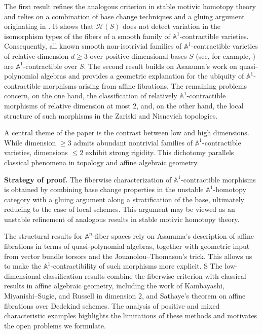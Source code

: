 \documentclass[10pt]{amsart}
\renewcommand{\AA}{\mathbb{A}}
\numberwithin{equation}{section} %
\theoremstyle{plain}
\theoremstyle{definition}
\theoremstyle{remark}
\begin{document}
The first result refines the analogous criterion in stable motivic homotopy theory and relies on a combination of base change techniques and a gluing argument originating in \cite{MV99}. It shows that $\mathcal{H}(S)$ does not detect variation in the isomorphism types of the fibers of a smooth family of $\AA^1$-contractible varieties. Consequently, all known smooth non-isotrivial families of $\AA^1$-contractible varieties of relative dimension $d \geq 3$ over positive-dimensional bases $S$ (see, for example, \cite{DF14,dubouloz2025,Krishna25}) are $\AA^1$-contractible over $S$. 
The second result builds on Asanuma’s work on quasi-polynomial algebras \cite{asanuma82,asanuma1987polynomial} and provides a geometric explanation for the ubiquity of $\AA^1$-contractible morphisms arising from affine fibrations. 
The remaining problems concern, on the one hand, the classification of relatively $\AA^1$-contractible morphisms of relative dimension at most $2$, and, on the other hand, the local structure of such morphisms in the Zariski and Nisnevich topologies.
\medskip

A central theme of the paper is the contrast between low and high dimensions. While dimension $\geq 3$ admits abundant nontrivial families of $\AA^1$-contractible varieties, dimensions $\leq 2$ exhibit strong rigidity. This dichotomy parallels classical phenomena in topology and affine algebraic geometry.
\medskip
\noindent

\textbf{Strategy of proof.}
The fiberwise characterization of $\AA^1$-contractible morphisms is obtained by combining base change properties in the unstable $\AA^1$-homotopy category with a gluing argument along a stratification of the base, ultimately reducing to the case of local schemes. This argument may be viewed as an unstable refinement of analogous results in stable motivic homotopy theory.
\medskip

The structural results for $\AA^n$-fiber spaces rely on Asanuma’s description of affine fibrations in terms of quasi-polynomial algebras, together with geometric input from vector bundle torsors and the Jouanolou--Thomason's trick. This allows us to make the $\AA^1$-contractibility of such morphisms more explicit.
\medskip
S
The low-dimensional classification results combine the fiberwise criterion with classical results in affine algebraic geometry, including the work of Kambayashi, Miyanishi--Sugie, and Russell in dimension $2$, and Sathaye’s theorem on affine fibrations over Dedekind schemes. The analysis of positive and mixed characteristic examples highlights the limitations of these methods and motivates the open problems we formulate.
\medskip
\end{document}
